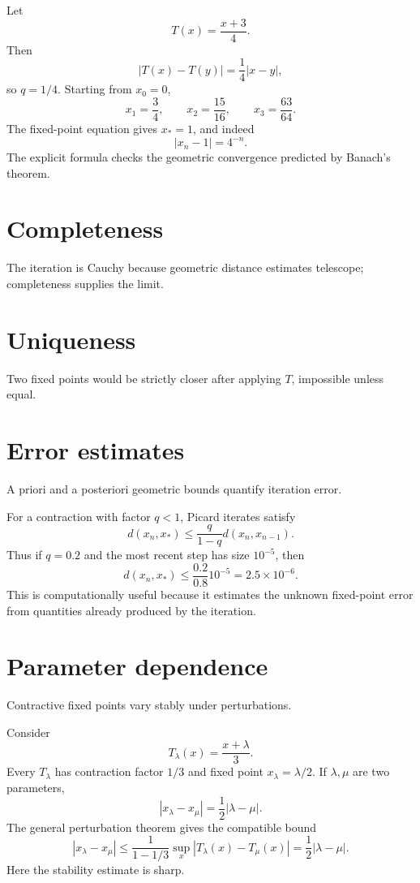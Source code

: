 \begin{example}\label{ex:ii16-expand-01}
Let
\[
T(x)=\frac{x+3}{4}.
\]
Then
\[
|T(x)-T(y)|=\frac14|x-y|,
\]
so \(q=1/4\). Starting from \(x_0=0\),
\[
x_1=\frac34,\qquad x_2=\frac{15}{16},\qquad x_3=\frac{63}{64}.
\]
The fixed-point equation gives \(x_*=1\), and indeed
\[
|x_n-1|=4^{-n}.
\]
The explicit formula checks the geometric convergence predicted by Banach's
theorem.
\end{example}
\section{Completeness}
The iteration is Cauchy because geometric distance estimates telescope; completeness supplies the limit.

\section{Uniqueness}
Two fixed points would be strictly closer after applying $T$, impossible unless equal.

\section{Error estimates}
A priori and a posteriori geometric bounds quantify iteration error.


\begin{example}\label{ex:ii16-expand-02}
For a contraction with factor \(q<1\), Picard iterates satisfy
\[
d(x_n,x_*)\le \frac{q}{1-q}d(x_n,x_{n-1}).
\]
Thus if \(q=0.2\) and the most recent step has size \(10^{-5}\), then
\[
d(x_n,x_*)\le\frac{0.2}{0.8}10^{-5}=2.5\times10^{-6}.
\]
This is computationally useful because it estimates the unknown fixed-point
error from quantities already produced by the iteration.
\end{example}
\section{Parameter dependence}
Contractive fixed points vary stably under perturbations.


\begin{example}\label{ex:ii16-expand-03}
Consider
\[
T_\lambda(x)=\frac{x+\lambda}{3}.
\]
Every \(T_\lambda\) has contraction factor \(1/3\) and fixed point
\(x_\lambda=\lambda/2\). If \(\lambda,\mu\) are two parameters,
\[
|x_\lambda-x_\mu|=\frac12|\lambda-\mu|.
\]
The general perturbation theorem gives the compatible bound
\[
|x_\lambda-x_\mu|
\le\frac{1}{1-1/3}\sup_x|T_\lambda(x)-T_\mu(x)|
=\frac12|\lambda-\mu|.
\]
Here the stability estimate is sharp.
\end{example}
